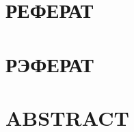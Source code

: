 \chapter*{\large РЕФЕРАТ}  



\newpage
\chapter*{\large РЭФЕРАТ} 



\newpage
\chapter*{\large ABSTRACT} 



\newpage
